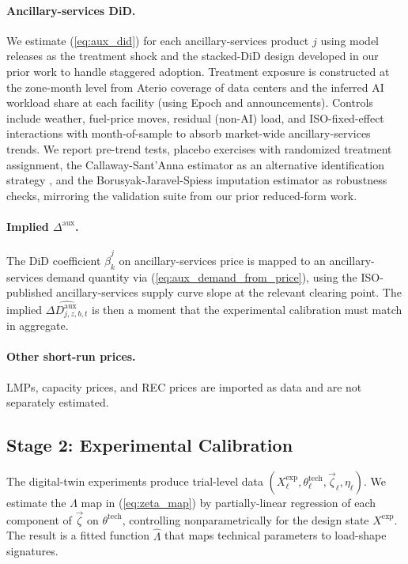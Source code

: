 \documentclass[12pt,letterpaper]{article}
\begin{document}
\paragraph{Ancillary-services DiD.} We estimate (\ref{eq:aux_did}) for each
ancillary-services product $j$ using model releases as the treatment shock
and the stacked-DiD design developed in our prior work to handle staggered
adoption. Treatment exposure is constructed at the zone-month level from
Aterio coverage of data centers and the inferred AI workload share at
each facility (using Epoch and announcements). Controls include weather,
fuel-price moves, residual (non-AI) load, and ISO-fixed-effect interactions
with month-of-sample to absorb market-wide ancillary-services trends. We
report pre-trend tests, placebo exercises with randomized treatment
assignment, the Callaway-Sant'Anna estimator as an alternative
identification strategy \citep{callaway2021difference}, and the
Borusyak-Jaravel-Spiess imputation estimator \citep{borusyak2024revisiting}
as robustness checks, mirroring the validation suite from our prior
reduced-form work.

\paragraph{Implied $\Delta^{\text{aux}}$.} The DiD coefficient
$\hat\beta^j_k$ on ancillary-services price is mapped to an
ancillary-services demand quantity via (\ref{eq:aux_demand_from_price}),
using the ISO-published ancillary-services supply curve slope at the
relevant clearing point. The implied $\widehat{\Delta D^{\text{aux}}_{j,z,b,t}}$
is then a moment that the experimental calibration must match in
aggregate.

\paragraph{Other short-run prices.} LMPs, capacity prices, and REC prices
are imported as data and are not separately estimated.

\subsection{Stage 2: Experimental Calibration}
\label{sec:est_exp}

The digital-twin experiments produce trial-level data $(X^{\text{exp}}_\ell,
\theta^{\text{tech}}_\ell, \vec\zeta_\ell, \eta_\ell)$. We estimate the
$\Lambda$ map in (\ref{eq:zeta_map}) by partially-linear regression of each
component of $\vec\zeta$ on $\theta^{\text{tech}}$, controlling
nonparametrically for the design state $X^{\text{exp}}$. The result is a
fitted function $\hat\Lambda$ that maps technical parameters to load-shape
signatures.
\end{document}
